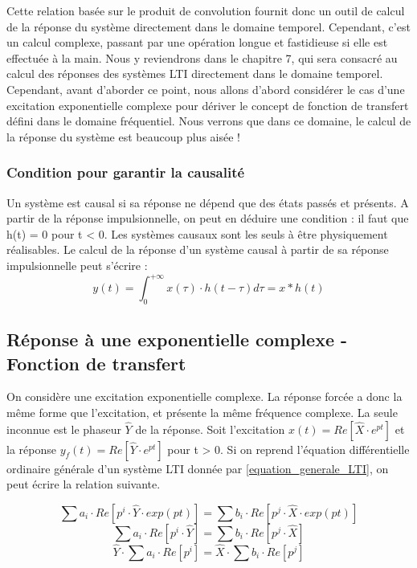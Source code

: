 \documentclass[]{book}
\begin{document}
{	Cette relation basée sur le produit de convolution fournit donc un outil de calcul de la réponse du système directement dans le domaine temporel. Cependant, c'est un calcul complexe, passant par une opération longue et fastidieuse si elle est effectuée à la main. Nous y reviendrons dans le chapitre 7, qui sera consacré au calcul des réponses des systèmes LTI directement dans le domaine temporel. Cependant, avant d'aborder ce point, nous allons d'abord considérer le cas d'une excitation exponentielle complexe pour dériver le concept de fonction de transfert défini dans le domaine fréquentiel. Nous verrons que dans ce domaine, le calcul de la réponse du système est beaucoup plus aisée !
	
	\subsubsection{Condition pour garantir la causalité}
	Un système est causal si sa réponse ne dépend que des états passés et présents. A partir de la réponse impulsionnelle, on peut en déduire une condition : il faut que h(t) = 0 pour t < 0. Les systèmes causaux sont les seuls à être physiquement réalisables. Le calcul de la réponse d'un système causal à partir de sa réponse impulsionnelle peut s'écrire :
	\begin{equation}\label{}
	y(t) = \int_{0}^{+ \infty} x(\tau) \cdot h(t-\tau)d\tau = x*h(t)
	\end{equation}
	\vspace{1\baselineskip}	
	
	
	\subsection{Réponse à une exponentielle complexe - Fonction de transfert}
	On considère une excitation exponentielle complexe. La réponse forcée a donc la même forme que l'excitation, et présente la même fréquence complexe. La seule inconnue est le phaseur $\hat{Y}$ de la réponse. Soit l'excitation $ x(t) = Re[\hat{X} \cdot e^{pt}]$ et la réponse $ y_{f}(t) = Re[\hat{Y} \cdot e^{pt}]$ pour t > 0. Si on reprend l'équation différentielle ordinaire générale d'un système LTI donnée par \ref{equation_generale_LTI}, on peut écrire la relation suivante.
	
	\begin{equation*}\label{}
	\sum a_{i} \cdot Re[p^{i} \cdot \hat{Y} \cdot exp(pt)] = \sum b_{i} \cdot Re[p^{j} \cdot \hat{X} \cdot exp(pt)]
	\end{equation*}
	\begin{equation*}\label{}
	\sum a_{i} \cdot Re[p^{i} \cdot \hat{Y}] = \sum b_{i} \cdot Re[p^{j} \cdot \hat{X}]
	\end{equation*}
	\begin{equation*}\label{}
	\hat{Y} \cdot \sum a_{i} \cdot Re[p^{i}] = \hat{X} \cdot \sum b_{i} \cdot Re[p^{j}]
	\end{equation*}
	
}
\end{document}
